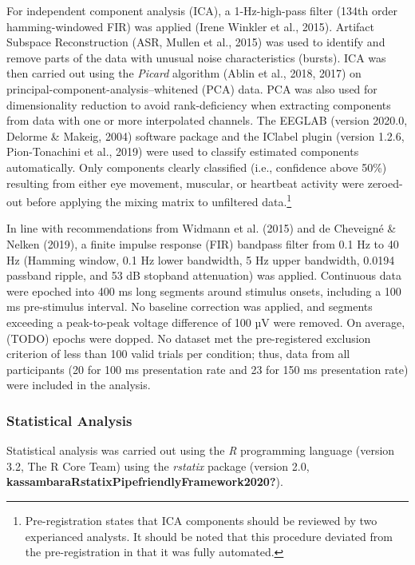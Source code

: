 \documentclass[twoside, man, a4paper,12pt, nofontenc]{apa7}
\begin{document}
For independent component analysis (ICA), a 1-Hz-high-pass filter (134th
order hamming-windowed FIR) was applied (Irene Winkler et al., 2015).
Artifact Subspace Reconstruction (ASR, Mullen et al., 2015) was used to
identify and remove parts of the data with unusual noise characteristics
(bursts). ICA was then carried out using the \emph{Picard} algorithm
(Ablin et al., 2018, 2017) on principal-component-analysis--whitened
(PCA) data. PCA was also used for dimensionality reduction to avoid
rank-deficiency when extracting components from data with one or more
interpolated channels. The EEGLAB (version 2020.0, Delorme \& Makeig,
2004) software package and the IClabel plugin (version 1.2.6,
Pion-Tonachini et al., 2019) were used to classify estimated components
automatically. Only components clearly classified (i.e., confidence
above 50\%) resulting from either eye movement, muscular, or heartbeat
activity were zeroed-out before applying the mixing matrix to unfiltered
data.\footnote{Pre-registration states that ICA components should be
  reviewed by two experianced analysts. It should be noted that this
  procedure deviated from the pre-registration in that it was fully
  automated.}

In line with recommendations from Widmann et al. (2015) and de Cheveigné
\& Nelken (2019), a finite impulse response (FIR) bandpass filter from
0.1 Hz to 40 Hz (Hamming window, 0.1 Hz lower bandwidth, 5 Hz upper
bandwidth, 0.0194 passband ripple, and 53 dB stopband attenuation) was
applied. Continuous data were epoched into 400 ms long segments around
stimulus onsets, including a 100 ms pre-stimulus interval. No baseline
correction was applied, and segments exceeding a peak-to-peak voltage
difference of 100 µV were removed. On average, (TODO) epochs were
dopped. No dataset met the pre-registered exclusion criterion of less
than 100 valid trials per condition; thus, data from all participants
(20 for 100 ms presentation rate and 23 for 150 ms presentation rate)
were included in the analysis.

\hypertarget{statistical-analysis}{%
\subsubsection{Statistical Analysis}\label{statistical-analysis}}

Statistical analysis was carried out using the \emph{R} programming
language (version 3.2, The R Core Team) using the \emph{rstatix} package
(version 2.0, \textbf{kassambaraRstatixPipefriendlyFramework2020?}).
\end{document}

